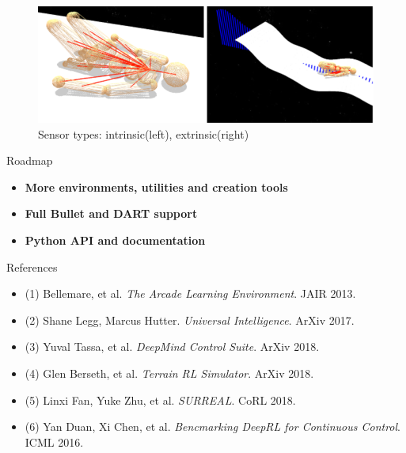 \documentclass[final]{beamer}
\newlength{\onecolwid}
\begin{document}
\begin{frame}[t]
\begin{columns}[t]
\begin{column}{\onecolwid}
\begin{figure}
    \includegraphics[width=0.85\linewidth]{_imgs/img_tysocmjc_sensors.png}
    \caption{Sensor types: intrinsic(left), extrinsic(right)}
\end{figure}

\begin{block}{Roadmap}

\begin{itemize}
    \item \textbf{More environments, utilities and creation tools}
    \item \textbf{Full Bullet and DART support}
    \item \textbf{Python API and documentation}
\end{itemize}

\end{block}


\begin{block}{References}

\begin{itemize}
\item (1) Bellemare, et al. \textit{The Arcade Learning Environment}. JAIR 2013.
\item (2) Shane Legg, Marcus Hutter. \textit{Universal Intelligence}. ArXiv 2017.
\item (3) Yuval Tassa, et al. \textit{DeepMind Control Suite}. ArXiv 2018.
\item (4) Glen Berseth, et al. \textit{Terrain RL Simulator}. ArXiv 2018.
\item (5) Linxi Fan, Yuke Zhu, et al. \textit{SURREAL}. CoRL 2018.
\item (6) Yan Duan, Xi Chen, et al. \textit{Bencmarking DeepRL for Continuous Control}. ICML 2016.
\end{itemize}

\end{block}



\end{column} %

\end{columns} %

\end{frame} %
\end{document}
